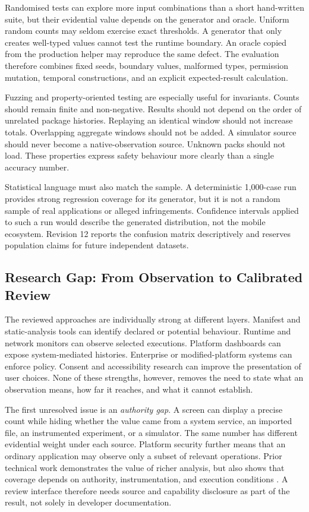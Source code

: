 Randomised tests can explore more input combinations than a short hand-written suite, but their evidential value depends on the generator and oracle. Uniform random counts may seldom exercise exact thresholds. A generator that only creates well-typed values cannot test the runtime boundary. An oracle copied from the production helper may reproduce the same defect. The evaluation therefore combines fixed seeds, boundary values, malformed types, permission mutation, temporal constructions, and an explicit expected-result calculation.

Fuzzing and property-oriented testing are especially useful for invariants. Counts should remain finite and non-negative. Results should not depend on the order of unrelated package histories. Replaying an identical window should not increase totals. Overlapping aggregate windows should not be added. A simulator source should never become a native-observation source. Unknown packs should not load. These properties express safety behaviour more clearly than a single accuracy number.

Statistical language must also match the sample. A deterministic 1,000-case run provides strong regression coverage for its generator, but it is not a random sample of real applications or alleged infringements. Confidence intervals applied to such a run would describe the generated distribution, not the mobile ecosystem. Revision 12 reports the confusion matrix descriptively and reserves population claims for future independent datasets.

\subsection{Research Gap: From Observation to Calibrated Review}

The reviewed approaches are individually strong at different layers. Manifest and static-analysis tools can identify declared or potential behaviour. Runtime and network monitors can observe selected executions. Platform dashboards can expose system-mediated histories. Enterprise or modified-platform systems can enforce policy. Consent and accessibility research can improve the presentation of user choices. None of these strengths, however, removes the need to state what an observation means, how far it reaches, and what it cannot establish.

The first unresolved issue is an \emph{authority gap}. A screen can display a precise count while hiding whether the value came from a system service, an imported file, an instrumented experiment, or a simulator. The same number has different evidential weight under each source. Platform security further means that an ordinary application may observe only a subset of relevant operations. Prior technical work demonstrates the value of richer analysis, but also shows that coverage depends on authority, instrumentation, and execution conditions \cite{49,androidpermissions2026}. A review interface therefore needs source and capability disclosure as part of the result, not solely in developer documentation.

